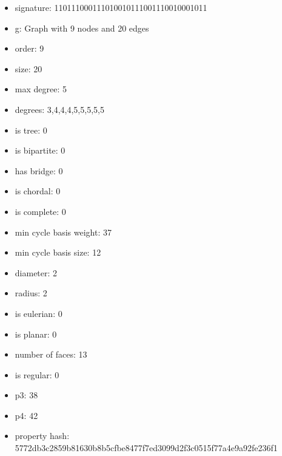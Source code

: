\newpage
\begin{figure}
\end{figure}
\begin{itemize}
\item signature: 110111000111010010111001110010001011
\item g: Graph with 9 nodes and 20 edges
\item order: 9
\item size: 20
\item max degree: 5
\item degrees: 3,4,4,4,5,5,5,5,5
\item is tree: 0
\item is bipartite: 0
\item has bridge: 0
\item is chordal: 0
\item is complete: 0
\item min cycle basis weight: 37
\item min cycle basis size: 12
\item diameter: 2
\item radius: 2
\item is eulerian: 0
\item is planar: 0
\item number of faces: 13
\item is regular: 0
\item p3: 38
\item p4: 42
\item property hash: 5772db3c2859b81630b8b5cfbe8477f7ed3099d2f3c0515f77a4e9a92fe236f1
\end{itemize}
